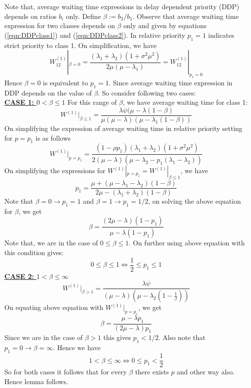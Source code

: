 \documentclass[a4paper,12pt]{article}
\newenvironment{mylemma}[1]{{ \textbf{\textit{Proof of Lemma #1:}}}}{}
\begin{document}
\begin{appendices}
\begin{mylemma}{\ref{clm:equivalenceDDPnRP}}
Note that, average waiting time expressions in delay dependent priority (DDP) depends on ratios $b_i$ only. Define $\beta := b_2/b_1$. Observe that average waiting time expression for two classes depends on $\beta$ only and given by equations (\ref{eqn:DDPclass1}) and (\ref{eqn:DDPclass2}). In relative priority $p_1 = 1$ indicates strict priority to class 1. On simplification, we have
\begin{equation}
W_{12}^{(1)}|_{\beta = 0} = \dfrac{(\lambda_1 + \lambda_2)(1+\sigma^2\mu^2)}{2\mu (\mu -\lambda_1)} = W_{12}^{(1)}|_{p_1 = 0}
\end{equation}
Hence $\beta = 0 $ is equivalent to $p_1 =1$. Since average waiting time expression in DDP depends on the value of $\beta$. So consider following two cases:\\
\textbf{\underline{CASE 1: $0 < \beta \leq 1$}} For this range of $\beta$, we have average waiting time for class 1:
$$W^{(1)}|_{\beta \leq 1} = \dfrac{\lambda \psi(\mu - \lambda(1-\beta)}{\mu(\mu -\lambda)(\mu - \lambda_1(1-\beta))}$$
On simplifying the expression of average waiting time in relative priority setting for $p = p_1$ is as follows
\begin{equation}
W^{(1)}|_{p = p_1 } = \dfrac{(1-\rho p_1)(\lambda_1 + \lambda_2)(1+\sigma^2 \mu^2)}{2(\mu-\lambda)(\mu - \lambda_2 - p_1(\lambda_1 - \lambda_2))}
\end{equation} 
On simplifying the expressions for $W^{(1)}|_{p = p_1 } = W^{(1)}|_{\beta \leq 1} $, we have 
\begin{equation}
p_1 = \dfrac{\mu + (\mu - \lambda_1 - \lambda_2)(1-\beta)}{2 \mu -(\lambda_1 + \lambda_2)(1-\beta)}
\end{equation}
Note that $\beta = 0 \rightarrow p_1 =1$ and $\beta = 1 \rightarrow p_1 =1/2$, on solving the above equation for $\beta$, we get
\begin{equation}
\beta = \dfrac{(2\mu - \lambda)(1 - p_1)}{\mu - \lambda(1 - p_1)}
\end{equation}
Note that, we are in the case of $0 \leq \beta \le 1$. On further using above equation with this condition gives:
$$0 \leq \beta \leq 1 \Leftrightarrow \frac{1}{2} \leq p_1 \leq 1$$ 
\textbf{\underline{CASE 2: $1 < \beta \leq \infty $}}
$$W^{(1)}|_{\beta > 1} = \dfrac{\lambda\psi}{(\mu - \lambda)(\mu - \lambda_2(1 - \frac{1}{\beta}))}$$
 On equating above equation with $W^{(1)}|_{p=p_1}$, we get
 \begin{equation}
 \beta = \dfrac{\mu -\lambda p_1}{(2\mu -\lambda)p_1}
 \end{equation}
Since we are in the case of $\beta > 1$ this gives $p_1 < 1/2$. Also note that $p_1 = 0  \rightarrow \beta = \infty$. Hence we have 
$$ 1 < \beta \leq \infty \Leftrightarrow 0 \leq p_1 < \frac{1}{2}$$ 
So for both cases it follows that for every $\beta $ there exists $p$ and other way also. Hence lemma follows. 
\end{mylemma}


\end{appendices}
\end{document}
